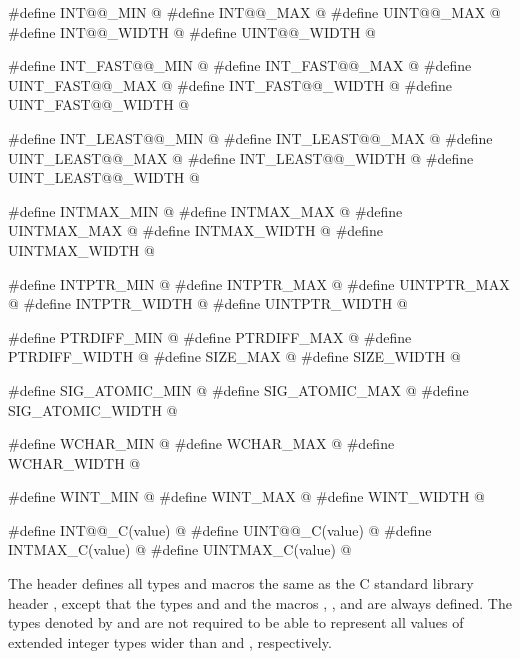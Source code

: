 \begin{codeblock}
#define INT@@_MIN          @\seebelow@
#define INT@@_MAX          @\seebelow@
#define UINT@@_MAX         @\seebelow@
#define INT@@_WIDTH        @\seebelow@
#define UINT@@_WIDTH       @\seebelow@

#define INT_FAST@@_MIN     @\seebelow@
#define INT_FAST@@_MAX     @\seebelow@
#define UINT_FAST@@_MAX    @\seebelow@
#define INT_FAST@@_WIDTH   @\seebelow@
#define UINT_FAST@@_WIDTH  @\seebelow@

#define INT_LEAST@@_MIN    @\seebelow@
#define INT_LEAST@@_MAX    @\seebelow@
#define UINT_LEAST@@_MAX   @\seebelow@
#define INT_LEAST@@_WIDTH  @\seebelow@
#define UINT_LEAST@@_WIDTH @\seebelow@

#define INTMAX_MIN        @\seebelow@
#define INTMAX_MAX        @\seebelow@
#define UINTMAX_MAX       @\seebelow@
#define INTMAX_WIDTH      @\seebelow@
#define UINTMAX_WIDTH     @\seebelow@

#define INTPTR_MIN        @\seebelow@
#define INTPTR_MAX        @\seebelow@
#define UINTPTR_MAX       @\seebelow@
#define INTPTR_WIDTH      @\seebelow@
#define UINTPTR_WIDTH     @\seebelow@

#define PTRDIFF_MIN       @\seebelow@
#define PTRDIFF_MAX       @\seebelow@
#define PTRDIFF_WIDTH     @\seebelow@
#define SIZE_MAX          @\seebelow@
#define SIZE_WIDTH        @\seebelow@

#define SIG_ATOMIC_MIN    @\seebelow@
#define SIG_ATOMIC_MAX    @\seebelow@
#define SIG_ATOMIC_WIDTH  @\seebelow@

#define WCHAR_MIN         @\seebelow@
#define WCHAR_MAX         @\seebelow@
#define WCHAR_WIDTH       @\seebelow@

#define WINT_MIN          @\seebelow@
#define WINT_MAX          @\seebelow@
#define WINT_WIDTH        @\seebelow@

#define INT@@_C(value)     @\seebelow@
#define UINT@@_C(value)    @\seebelow@
#define INTMAX_C(value)   @\seebelow@
#define UINTMAX_C(value)  @\seebelow@
\end{codeblock}

\pnum
The header defines all types and macros the same as
the C standard library header ,
except that the types  and  and
the macros , , and 
are always defined.
The types denoted by  and 
are not required to be able to represent all values of extended integer types
wider than  and , respectively.

